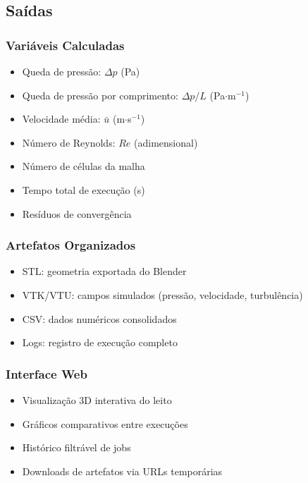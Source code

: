\subsection{Saídas}

\subsubsection{Variáveis Calculadas}

\begin{itemize}
    \item Queda de pressão: $\Delta p$ (Pa)
    \item Queda de pressão por comprimento: $\Delta p/L$ (Pa$\cdot$m$^{-1}$)
    \item Velocidade média: $\bar{u}$ (m$\cdot$s$^{-1}$)
    \item Número de Reynolds: $Re$ (adimensional)
    \item Número de células da malha
    \item Tempo total de execução (s)
    \item Resíduos de convergência
\end{itemize}

\subsubsection{Artefatos Organizados}

\begin{itemize}
    \item STL: geometria exportada do Blender
    \item VTK/VTU: campos simulados (pressão, velocidade, turbulência)
    \item CSV: dados numéricos consolidados
    \item Logs: registro de execução completo
\end{itemize}

\subsubsection{Interface Web}

\begin{itemize}
    \item Visualização 3D interativa do leito
    \item Gráficos comparativos entre execuções
    \item Histórico filtrável de jobs
    \item Downloads de artefatos via URLs temporárias
\end{itemize}

